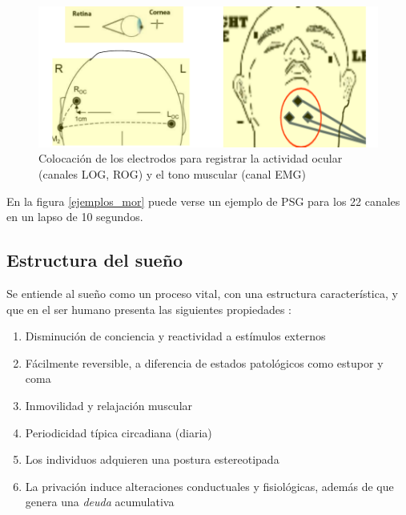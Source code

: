\begin{figure}
\centering
\includegraphics[width=\linewidth]
{./img_diagramas/emg_eog.pdf}
\caption{Colocación de los electrodos para registrar la actividad ocular (canales LOG, ROG) y el
tono muscular (canal EMG)}
\label{emg_eog}
\end{figure}

En la figura \ref{ejemplos_mor} puede verse un ejemplo de PSG para los 22 canales en un lapso de
10 segundos.


\subsection{Estructura del sueño}

Se entiende al sueño como un proceso vital, con una estructura característica, y que en el ser 
humano presenta las siguientes propiedades \cite{CarrilloMora}:
\begin{enumerate}
\item Disminución de conciencia y reactividad a estímulos externos
\item Fácilmente reversible, a diferencia de estados patológicos como estupor y coma
\item Inmovilidad y relajación muscular
\item Periodicidad típica circadiana (diaria)
\item Los individuos adquieren una postura estereotipada
\item La privación induce alteraciones conductuales y 
fisiológicas, además de que genera una \textit{deuda} acumulativa
\end{enumerate}

